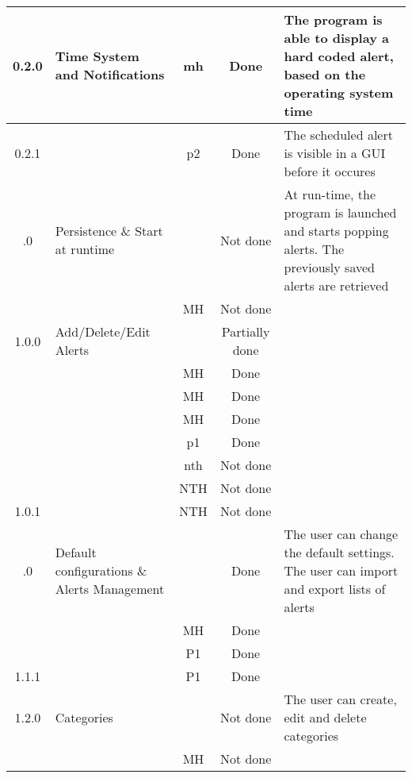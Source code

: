 \begin{longtable}{| c | p{5cm} | c | c | p{5cm} |}
	\rowcolor{aliceblue}0.2.0 & Time System and Notifications & \gls{mh} & Done & The program is able to display a hard coded alert, based on the operating system time \\ \hline
	\rowcolor{aliceblue}0.2.1 & \fullref{subsec:usecase_launch} & \gls{p2} & Done & The scheduled alert is visible in a GUI before it occures \\ \boldhr
	0.3.0 & Persistence \& Start at runtime & & Not done & At run-time, the program is launched and starts popping alerts. The previously saved alerts are retrieved \\ \hline
	& \fullref{subsec:usecase_auto_start} & MH & Not done & \\ \boldhr
	\rowcolor{aliceblue}1.0.0 & Add/Delete/Edit Alerts & & Partially done &  \\ \hline
	\rowcolor{aliceblue}& \fullref{subsec:usecase_add_simple_alert} & MH & Done &  \\ \hline
	\rowcolor{aliceblue}& \fullref{subsec:usecase_delete_simple_alert} & MH & Done &  \\ \hline
	\rowcolor{aliceblue}& \fullref{subsec:usecase_edit_simple_alert} & MH & Done &  \\ \hline
	\rowcolor{aliceblue}& \fullref{subsec:usecase_add_periodic_alert} & \gls{p1} & Done &  \\ \hline
	\rowcolor{aliceblue}& \fullref{subsec:usecase_add_email_sender} & \gls{nth} & Not done &  \\ \hline
	\rowcolor{aliceblue}& \fullref{subsec:usecase_delete_email_sender} & NTH & Not done &  \\ \hline
	\rowcolor{aliceblue}1.0.1 & \fullref{subsec:usecase_edit_email_sender} & NTH & Not done &  \\ \boldhr
	1.1.0 & Default configurations \& Alerts Management &  & Done & The user can change the default settings. The user can import and export lists of alerts\\ \hline
	& \fullref{subsec:usecase_edit_default_configuration} & MH & Done & \\ \hline
	& \fullref{subsec:usecase_import_alerts} & P1 & Done & \\ \hline
	1.1.1 & \fullref{subsec:usecase_export_alerts} & P1 & Done &\\ \boldhr
	\rowcolor{aliceblue}1.2.0 & Categories & & Not done & The user can create, edit and delete categories \\ \hline
	\rowcolor{aliceblue}& \fullref{subsec:usecase_add_category} & MH & Not done & \\ \hline

\end{longtable}
